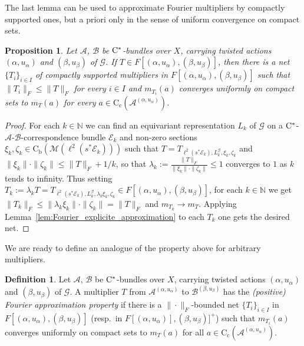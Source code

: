 \documentclass[11 pt, leqno]{amsart}
\numberwithin{equation}{section}
\theoremstyle{plain}
\newtheorem {prop}[thm] {Proposition}
\theoremstyle{definition}
\newtheorem {defn}[thm] {Definition}
\newcommand*{\contc}{\mathrm{C_c}}%
\newcommand*{\contb}{\mathrm{C_b}}%
\newcommand{\B}{\mathcal B}
\newcommand{\M}{\mathcal M}
\newcommand{\m}{m}
\newcommand{\G}{\mathcal G} %
\newcommand{\EE}{\mathcal E}
\newcommand{\A}{\mathcal A}
\newcommand{\N}{\mathbb N}
\newcommand{\cst}{\ifmmode\mathrm{C}^*\else{$\mathrm{C}^*$}\fi}
\begin{document}
The last lemma can be used to approximate Fourier multipliers by compactly supported ones, but a priori only in the sense of uniform convergence on compact sets.

\begin{prop}\label{pr:CompactSupportFourier}
Let $\A$, $\B$  be $\cst$-bundles over $X$, carrying twisted actions $(\alpha,u_\alpha)$ and $(\beta,u_\beta)$ of $\G$. 
If $T\in F[(\alpha,u_{\alpha}),(\beta,u_{\beta})]$, then  there is a net $\{T_{i}\}_{i\in I}$ of compactly supported multipliers in $ F[(\alpha,u_{\alpha}),(\beta,u_{\beta})]$ such that  $\| T_{i} \|_{F} \leq \| T \|_{F}$ for every $i \in I$ and $\m_{T_i}(a)$ converges uniformly on compact sets to $\m_{T}(a)$ for every $a\in\contc(\A^{(\alpha,u_{\alpha})})$.
\end{prop}
\begin{proof}
For each $k \in \N$ we can find an equivariant representation $L_k$ of $\G$ on a $\cst$-$\A$-$\B$-correspondence bundle $\EE_k$ and non-zero sections $\xi_k , \zeta_k \in \contb( \M(\ell^2(s^*\EE_k)) )$ such that $T=T_{\ell^2(s^*\EE_k) , L_k^\G , \xi_k , \zeta_k}$ and $\|\xi_k\|\cdot \|\zeta_k\|\leq \|T\|_F +{1/k}$, so that $\lambda_k := \frac{\|T\|_{F}}{\|\xi_k\|\cdot \|\zeta_k\|}\leq 1$ converges to $1$ as $k$ tends to infinity. 
Thus setting $T_k := \lambda_k T=T_{\ell^2(s^*\EE_k) , L_k^\G , \lambda_k\xi_k , \zeta_k} \in F[(\alpha,u_{\alpha}),(\beta,u_{\beta})]$, for each $k \in \N$ we get $\|T_k\|_F\leq  \|\lambda_k\xi_k\|\cdot\|\zeta_k\|=\|T\|_F$ and $m_{T_k}\to m_{T}$.
Applying Lemma~\ref{lem:Fourier_explicite_approximation} to each $T_k$ one gets the desired net.
\end{proof}

We are ready to define an analogue of the property above for arbitrary multipliers. 

\begin{defn}\label{def:Fourier_approximation_property}
Let $\A$, $\B$ be $\cst$-bundles over $X$, carrying twisted actions $(\alpha,u_\alpha)$ and $(\beta,u_\beta)$ of $\G$. 
A multiplier $T$ from $\A^{(\alpha,u_{\alpha})}$ to $\B^{(\beta,u_{\beta})}$ has the \emph{(positive) Fourier approximation property} if there is a $\|\cdot\|_{F}$-bounded net $\{T_{i}\}_{i\in I}$ in $F[(\alpha,u_{\alpha}),(\beta,u_{\beta})]$ (resp.\ in $ F[(\alpha,u_{\alpha})],(\beta,u_{\beta})]^+$) such that $\m_{T_i}(a)$ converges uniformly on compact sets to $\m_{T}(a)$ for all $a\in\contc(\A^{(\alpha,u_{\alpha})})$.
\end{defn}
\end{document}
